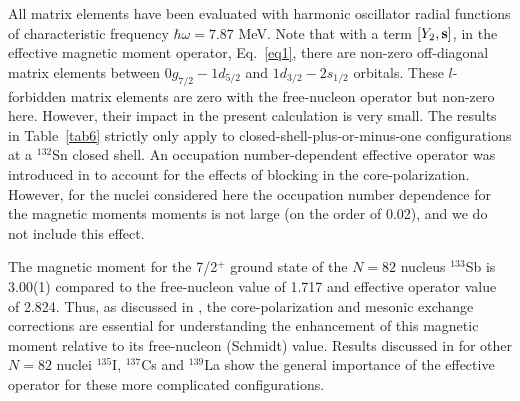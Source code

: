 \documentclass[aps,twocolumn,superscriptaddress,prc,showpacs]{revtex4}
\begin{document}
All matrix elements have
been evaluated with harmonic oscillator radial functions of
characteristic frequency $  \hbar \omega = 7.87  $ MeV.  Note that with
a term $  [Y_{2}, {\bf s}]  $, in the effective magnetic moment
operator,
Eq.~\ref{eq1}, there are non-zero off-diagonal matrix elements
between $  0g_{7/2}-1d_{5/2}  $
and $  1d_{3/2}-2s_{1/2}  $ orbitals.  These $  l  $-forbidden matrix
elements
are zero with the free-nucleon
operator but non-zero here.  However, their impact in the present
calculation is very small.
The results in Table~\ref{tab6} strictly only apply to
closed-shell-plus-or-minus-one configurations at a $^{132}$Sn closed
shell. An occupation number-dependent effective operator was
introduced in \cite{white} to account for the effects of blocking in the
core-polarization.  However, for the nuclei considered here
the occupation number dependence for the magnetic moments
moments is not large (on the order of 0.02), and we do not
include this effect.

The magnetic moment for the 7/2$^+$ ground state of the
$N=82$ nucleus $^{133}$Sb is 3.00(1) \cite{St97} compared to the 
free-nucleon value of 1.717 and effective operator
value of 2.824. Thus, as discussed in \cite{St97}, the
core-polarization and mesonic exchange corrections 
are essential for understanding the enhancement of this
magnetic moment relative to its free-nucleon (Schmidt)
value. Results discussed in \cite{white} for other
$N=82$ nuclei $^{135}$I, $^{137}$Cs and $^{139}$La
show the general importance of the effective operator
for these more complicated configurations. 
\end{document}

